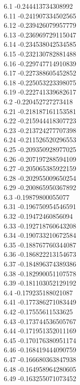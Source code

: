 {6.1	-0.244413734308992\\
6.11	-0.241907334502565\\
6.12	-0.239426079957779\\
6.13	-0.236969729115047\\
6.14	-0.234538042534585\\
6.15	-0.232130782881488\\
6.16	-0.229747714910839\\
6.17	-0.227388605452852\\
6.18	-0.225053223398075\\
6.19	-0.222741339682617\\
6.2	-0.220452727273418\\
6.21	-0.218187161153581\\
6.22	-0.215944418307723\\
6.23	-0.213724277707398\\
6.24	-0.211526520296553\\
6.25	-0.209350928977025\\
6.26	-0.207197288594109\\
6.27	-0.205065385922159\\
6.28	-0.202955009650254\\
6.29	-0.200865950367892\\
6.3	-0.19879800055077\\
6.31	-0.196750954546591\\
6.32	-0.19472460856094\\
6.33	-0.192718760643208\\
6.34	-0.190733210672584\\
6.35	-0.188767760344087\\
6.36	-0.186822213154673\\
6.37	-0.184896374389386\\
6.38	-0.182990051107578\\
6.39	-0.181103052129192\\
6.4	-0.179235188021087\\
6.41	-0.177386271083449\\
6.42	-0.17555611533625\\
6.43	-0.173744536505767\\
6.44	-0.171951352011169\\
6.45	-0.170176380951174\\
6.46	-0.168419444090759\\
6.47	-0.166680363847938\\
6.48	-0.164958964280605\\
6.49	-0.163255071073452\\
}
